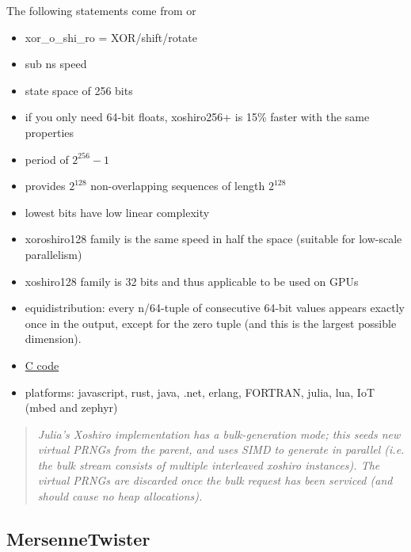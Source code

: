 \documentclass{article}
\begin{document}
            The following statements come from \cite{XoroshiroPaper} or \cite{Shootout}
            \begin{itemize}
                \item xor\_o\_shi\_ro = XOR/shift/rotate
                \item sub ns speed
                \item state space of 256 bits
                \item if you only need 64-bit floats, xoshiro256+ is 15\% faster with the same properties
                \item period of $2^{256} - 1$
                \item provides $2^{128}$ non-overlapping sequences of length $2^{128}$
                \item lowest bits have low linear complexity
                \item xoroshiro128 family is the same speed in half the space (suitable for low-scale parallelism)
                \item xoshiro128 family is 32 bits and thus applicable to be used on GPUs
                \item equidistribution: every n/64-tuple of consecutive 64-bit values appears exactly once in the output, except for the zero tuple (and this is the largest possible dimension).
                \item \href{https://prng.di.unimi.it/xoshiro256plusplus.c}{C code}
                \item platforms: javascript, rust, java, .net, erlang, FORTRAN, julia, lua, IoT (mbed and zephyr)
            \end{itemize}

            \begin{quote}
                \textit{Julia's Xoshiro implementation has a bulk-generation mode; this seeds new virtual PRNGs from the parent, and uses SIMD to generate in parallel (i.e. the bulk stream consists of multiple interleaved xoshiro instances). The virtual PRNGs are discarded once the bulk request has been serviced (and should cause no heap allocations).}
            \end{quote}
        
        \subsection*{MersenneTwister}
\end{document}
